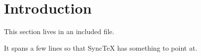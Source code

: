 \section{Introduction}
This section lives in an included file.

It spans a few lines so that SyncTeX has something to point at.
